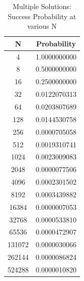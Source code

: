 \begin{table}[ht]
    \centering
    \begin{tabular}{c|c}
    N & Probability \\
    \hline
        4	& 1.0000000000 \\
        8	& 0.5000000000 \\
        16	& 0.2500000000 \\
        32	& 0.0122070313 \\
        64	& 0.0203807689 \\
        128	& 0.0144530758 \\
        256	& 0.0000705058 \\
        512	& 0.0019310741 \\
        1024	& 0.0023009083 \\
        2048	& 0.0000077506 \\
        4096	& 0.0002301502 \\
        8192	& 0.0003439882 \\
        16384	& 0.0000007053 \\
        32768	& 0.0000533810 \\
        65536	& 0.0000472907 \\
        131072	& 0.0000030066 \\
        262144	& 0.0000086824 \\
        524288	& 0.0000010820 \\ 
    \end{tabular}
    \caption{Multiple Solutions: Success Probability at various N}
    \label{tab:multiple_solns}
\end{table}


